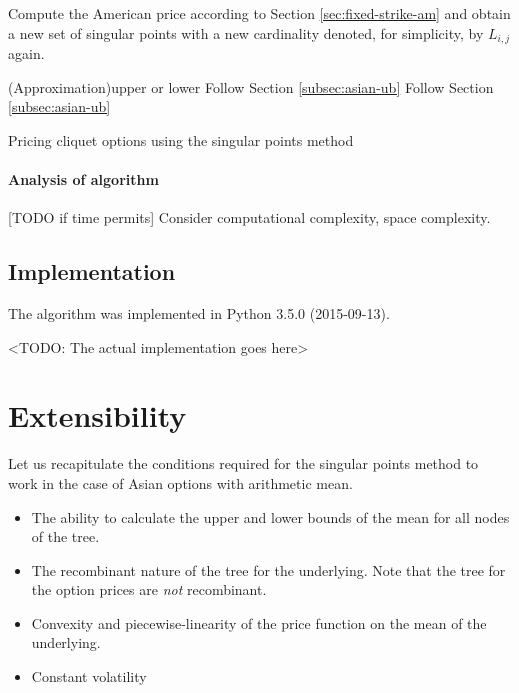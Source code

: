 \begin{algorithm}[H]
{{{				Compute the American price according to Section \ref{sec:fixed-strike-am} and obtain a new set of singular points with a new cardinality denoted, for simplicity, by $ L_{i,j} $ again. \;
				
				\Switch(Approximation){upper or lower}{
					 {Follow Section \ref{subsec:asian-ub} \;}
					 {Follow Section \ref{subsec:asian-ub} \;}
				}
			}
		}
	}
	
	\caption{Pricing cliquet options using the singular points method}
\end{algorithm}

\paragraph{Analysis of algorithm}
[TODO if time permits] Consider computational complexity, space complexity.


\subsection{Implementation}
The algorithm was implemented in Python 3.5.0 (2015-09-13).

<TODO: The actual implementation goes here>



\section{Extensibility}
\label{sec:asian-extensions}

Let us recapitulate the conditions required for the singular points method to work in the case of Asian options with arithmetic mean.
\begin{itemize}
	\item The ability to calculate the upper and lower bounds of the mean for all nodes of the tree.
	\item The recombinant nature of the tree for the underlying. Note that the tree for the option prices are \emph{not} recombinant.
	\item Convexity and piecewise-linearity of the price function on the mean of the underlying.
	\item Constant volatility
\end{itemize}

